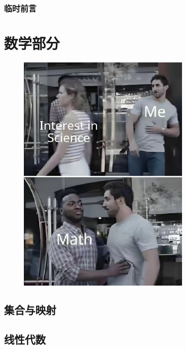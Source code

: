 \documentclass[zihao=-4,linespread=1.5,a4paper,heading=true,twoside]{ctexbook}
\theoremstyle{definition}
\theoremstyle{plain}
\begin{document}
\frontmatter
{}
\section*{临时前言}\label{sec:preface}


\tableofcontents
\mainmatter
{}

\part{数学部分}
\begin{figure}[p]
    \centering
    \includegraphics[width=0.75\textwidth]{images/math.jpg}
\end{figure}
\chapter{集合与映射}\label{sec:II.1}
\label{sec:II.1.1}
\label{sec:II.1.2}
\label{sec:II.1.3}

\chapter{线性代数}\label{sec:II.2}
\end{document}
